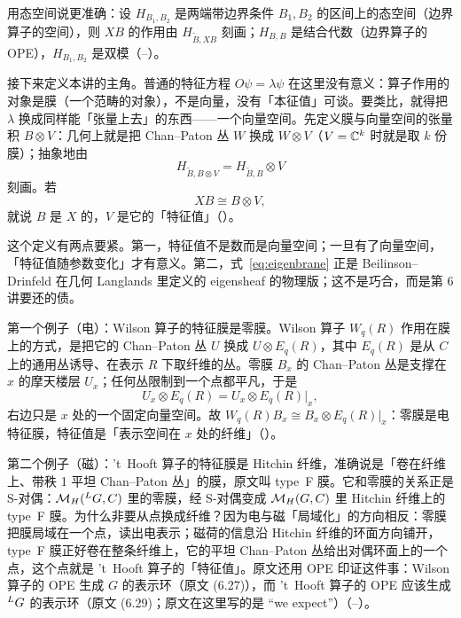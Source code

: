 用态空间说更准确：设 $H_{B_1,B_2}$ 是两端带边界条件 $B_1,B_2$ 的区间上的态空间（边界算子的空间），则 $XB$ 的作用由 $H_{\tilde B,XB}$ 刻画；$H_{B,B}$ 是结合代数（边界算子的 OPE），$H_{B_1,B_2}$ 是双模（--）。

接下来定义本讲的主角。普通的特征方程 $O\psi=\lambda\psi$ 在这里没有意义：算子作用的对象是膜（一个范畴的对象），不是向量，没有「本征值」可谈。要类比，就得把 $\lambda$ 换成同样能「张量上去」的东西——一个向量空间。先定义膜与向量空间的张量积 $B\otimes V$：几何上就是把 Chan--Paton 丛 $W$ 换成 $W\otimes V$（$V=\mathbb{C}^k$ 时就是取 $k$ 份膜）；抽象地由
\begin{equation}
H_{\tilde B,B\otimes V}=H_{\tilde B,B}\otimes V
\label{eq:tensor}
\end{equation}
刻画。若
\begin{equation}
XB\cong B\otimes V,
\label{eq:eigenbrane}
\end{equation}
就说 $B$ 是 $X$ 的，$V$ 是它的「特征值」（）。

这个定义有两点要紧。第一，特征值不是数而是向量空间；一旦有了向量空间，「特征值随参数变化」才有意义。第二，式~\eqref{eq:eigenbrane} 正是 Beilinson--Drinfeld 在几何 Langlands 里定义的 eigensheaf 的物理版；这不是巧合，而是第 6 讲要还的债。

第一个例子（电）：Wilson 算子的特征膜是零膜。Wilson 算子 $W_q(R)$ 作用在膜上的方式，是把它的 Chan--Paton 丛 $U$ 换成 $U\otimes E_q(R)$，其中 $E_q(R)$ 是从 $C$ 上的通用丛诱导、在表示 $R$ 下取纤维的丛。零膜 $B_x$ 的 Chan--Paton 丛是支撑在 $x$ 的摩天楼层 $U_x$；任何丛限制到一个点都平凡，于是
\begin{equation}
U_x\otimes E_q(R)=U_x\otimes E_q(R)|_x,
\label{eq:zerobrane}
\end{equation}
右边只是 $x$ 处的一个固定向量空间。故 $W_q(R)B_x\cong B_x\otimes E_q(R)|_x$：零膜是电特征膜，特征值是「表示空间在 $x$ 处的纤维」（）。

第二个例子（磁）：'t~Hooft 算子的特征膜是 Hitchin 纤维，准确说是「卷在纤维上、带秩 1 平坦 Chan--Paton 丛」的膜，原文叫 type~F 膜。它和零膜的关系正是 S-对偶：$\mathcal{M}_{H}({}^{L}G,C)$ 里的零膜，经 S-对偶变成 $\mathcal{M}_{H}(G,C)$ 里 Hitchin 纤维上的 type~F 膜。为什么非要从点换成纤维？因为电与磁「局域化」的方向相反：零膜把膜局域在一个点，读出电表示；磁荷的信息沿 Hitchin 纤维的环面方向铺开，type~F 膜正好卷在整条纤维上，它的平坦 Chan--Paton 丛给出对偶环面上的一个点，这个点就是 't~Hooft 算子的「特征值」。原文还用 OPE 印证这件事：Wilson 算子的 OPE 生成 $G$ 的表示环（原文 (6.27)），而 't~Hooft 算子的 OPE 应该生成 ${}^{L}G$ 的表示环（原文 (6.29)；原文在这里写的是 “we expect”）（--）。

